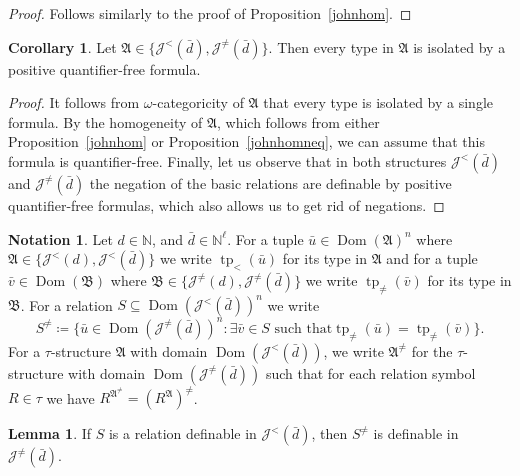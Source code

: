 \documentclass{amsart}
\theoremstyle{definition}
\newtheorem{lemma}[theorem]{Lemma}
\newtheorem{corollary}[theorem]{Corollary}
\newtheorem{notation}[theorem]{Notation}
\theoremstyle{remark}
\numberwithin{equation}{section}
\newcommand{\dom}{\operatorname{Dom}}
\newcommand{\typ}{\operatorname{tp}}
\newcommand\johnord[1]{\mathcal{J}^{<}(#1)}
\newcommand\johnneq[1]{\mathcal{J}^{\neq}(#1)}
\newcommand{\fa}{\mathfrak{A}}
\newcommand{\fb}{\mathfrak{B}}
\begin{document}
\begin{proof}
	Follows similarly to the proof of Proposition~\ref{johnhom}.
\end{proof}

\begin{corollary}\label{positive_hom}
	Let $\fa\in \{\johnord{\bar{d}},\johnneq{\bar{d}}\}$. Then every type in $\fa$ is isolated by a positive quantifier-free formula.
\end{corollary}

\begin{proof}
	It follows from $\omega$-categoricity of $\fa$ that every type is isolated by a single formula. By the homogeneity of $\fa$, which follows from either Proposition~\ref{johnhom} or Proposition~\ref{johnhomneq}, we can assume that this formula is quantifier-free. Finally, let us observe that in both structures $\johnord{\bar{d}}$ and $\johnneq{\bar{d}}$ the negation of the basic relations are definable by positive quantifier-free formulas, which also allows us to get rid of negations.
\end{proof}

\begin{notation}
 	Let $d\in {\mathbb N}$, and $\bar{d}\in \mathbb{N}^{\ell}$.
	For a tuple $\bar{u}\in \dom(\fa)^n$ where $\fa\in \{\johnord{d},\johnord{\bar{d}}\}$ we write $\typ_<(\bar{u})$ for its type in $\fa$ and for a tuple $\bar{v}\in \dom(\fb)$ where $\fb\in \{\johnneq{d},\johnneq{\bar{d}}\}$ we write $\typ_{\neq}(\bar{v})$ for its type in $\fb$.
	For a relation $S \subseteq \dom(\johnord{\bar{d}})^n$ we write $$S^{\neq}\coloneqq \{\bar{u}\in \dom(\johnneq{\bar{d}})^n: \exists \bar{v}\in S \text{ such that} \typ_{\neq}(\bar{u})=\typ_{\neq}(\bar{v})\}.$$
	For a $\tau$-structure $\fa$ with domain $\dom(\johnord{\bar{d}})$, we write $\fa^{\neq}$ for the $\tau$-structure with domain $\dom(\johnneq{\bar{d}})$ such that for each relation symbol $R \in \tau$ we have $R^{\fa^{\neq}}=(R^{\fa})^{\neq}$.
\end{notation}

\begin{lemma}\label{remove_order}
	If $S$ is a relation definable in $\johnord{\bar{d}}$, then $S^{\neq}$ is definable in $\johnneq{\bar{d}}$.
\end{lemma}
\end{document}
